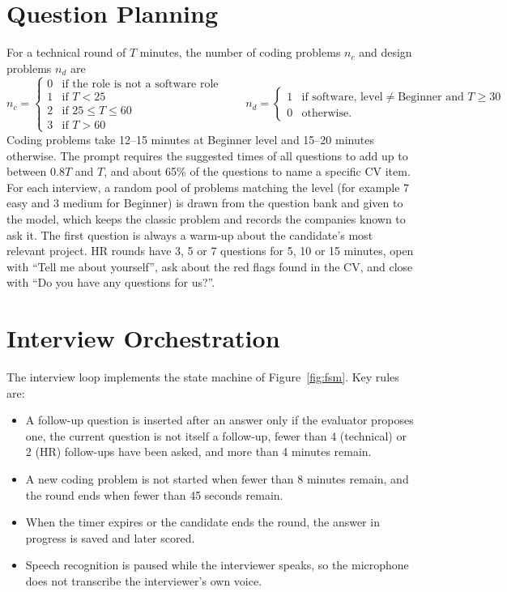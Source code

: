 \documentclass[12pt,a4paper,oneside]{report}
\begin{document}
\section{Question Planning}
For a technical round of $T$ minutes, the number of coding problems $n_c$ and design problems $n_d$ are
\begin{equation}
n_c = \begin{cases}
0 & \text{if the role is not a software role}\\
1 & \text{if } T < 25\\
2 & \text{if } 25 \le T \le 60\\
3 & \text{if } T > 60
\end{cases}
\qquad
n_d = \begin{cases}
1 & \text{if software, level} \neq \text{Beginner and } T \ge 30\\
0 & \text{otherwise.}
\end{cases}
\end{equation}
Coding problems take 12--15 minutes at Beginner level and 15--20 minutes otherwise. The prompt requires the suggested times of all questions to add up to between $0.8T$ and $T$, and about 65\% of the questions to name a specific CV item. For each interview, a random pool of problems matching the level (for example 7 easy and 3 medium for Beginner) is drawn from the question bank and given to the model, which keeps the classic problem and records the companies known to ask it. The first question is always a warm-up about the candidate's most relevant project. HR rounds have 3, 5 or 7 questions for 5, 10 or 15 minutes, open with ``Tell me about yourself'', ask about the red flags found in the CV, and close with ``Do you have any questions for us?''.

\section{Interview Orchestration}
The interview loop implements the state machine of Figure~\ref{fig:fsm}. Key rules are:
\begin{itemize}
  \item A follow-up question is inserted after an answer only if the evaluator proposes one, the current question is not itself a follow-up, fewer than 4 (technical) or 2 (HR) follow-ups have been asked, and more than 4 minutes remain.
  \item A new coding problem is not started when fewer than 8 minutes remain, and the round ends when fewer than 45 seconds remain.
  \item When the timer expires or the candidate ends the round, the answer in progress is saved and later scored.
  \item Speech recognition is paused while the interviewer speaks, so the microphone does not transcribe the interviewer's own voice.
\end{itemize}
\end{document}
